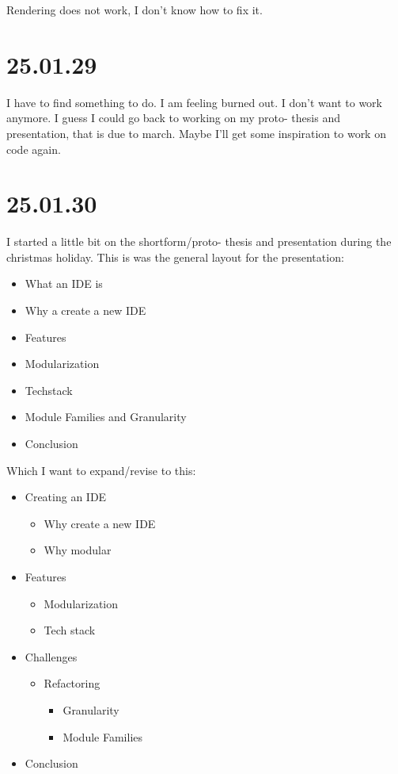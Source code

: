 Rendering does not work, I don't know how to fix it.


\section{25.01.29}

I have to find something to do. I am feeling burned out. I don't want to work
anymore. I guess I could go back to working on my proto- thesis and presentation,
that is due to march. Maybe I'll get some inspiration to work on code again.


\section{25.01.30}

I started a little bit on the shortform/proto- thesis and presentation during
the christmas holiday. This is was the general layout for the presentation:

\begin{itemize}
  \item What an IDE is
  \item Why a create a new IDE
  \item Features
  \item Modularization
  \item Techstack
  \item Module Families and Granularity
  \item Conclusion
\end{itemize}

Which I want to expand/revise to this:

\begin{itemize}
  \item Creating an IDE
  \begin{itemize}
    \item Why create a new IDE
    \item Why modular
  \end{itemize}
  \item Features
  \begin{itemize}
    \item Modularization
    \item Tech stack
  \end{itemize}
  \item Challenges
  \begin{itemize}
    \item Refactoring
    \begin{itemize}
      \item Granularity
      \item Module Families
    \end{itemize}
  \end{itemize}
  \item Conclusion
\end{itemize}

